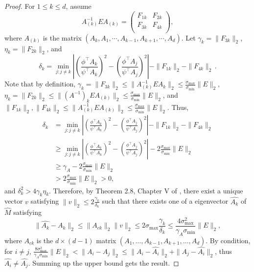 \begin{proof}
For $1\le k\le d$, assume 
\[
A_{(k)}^{-1} E A_{(k)} =  
\left(
\begin{array}{cc}
F_{1k} & F_{2k}\\
F_{3k} & F_{4k} \\
\end{array} 
\right), 
\]
where $A_{(k)}$ is the matrix $(A_k, A_1, \cdots, A_{k-1}, A_{k+1}, \cdots, A_d)$.
Let $\gamma_k = \|F_{3k}\|_2$, $\eta_k = \|F_{2k}\|_2$, and 
\[
\delta_k = \min_{j: j\neq k} 
\left\vert \left(\frac{\phi^{\top}A_k}{\psi^{\top}A_k}\right)^2 -\left( \frac{\phi^{\top}A_j}{\psi^{\top}A_j}\right)^2 \right\vert - \|F_{1k}\|_2 - \|F_{4k}\|_2\,.
\]
Note that by definition, $\gamma_k = \|F_{3k}\|_2\le\|A_{(k)}^{-1}EA_{k}\|_2\le\frac{\sigma_{\max}}{\sigma_{\min}}\|E\|_2$,
 $\eta_k = \|F_{2k}\|_2\le\|(A^{-1})_kEA_{(k)}\|_2\le\frac{\sigma_{\max}}{\sigma_{\min}}\|E\|_2$, 
 and $\|F_{1k}\|_2,\|F_{4k}\|_2\le\|A_{(k)}^{-1} E A_{(k)}\|_2\le\frac{\sigma_{\max}}{\sigma_{\min}}\|E\|_2$. 
 Thus,
\begin{align*}
\delta_k & = \min_{j:j\neq k} 
	\left\vert \left(\frac{\phi^{\top}A_k}{\psi^{\top}A_k}\right)^2 - \left(\frac{\phi^{\top}A_j}{\psi^{\top}A_j}\right)^2 \right\vert - \|F_{1k}\|_2 - \|F_{4k}\|_2\\
	& \ge \min_{j:j\neq k} \left\vert \left(\frac{\phi^{\top}A_k}{\psi^{\top}A_k}\right)^2 - \left(\frac{\phi^{\top}A_j}{\psi^{\top}A_j}\right)^2 \right\vert - 2 \frac{\sigma_{\max}}{\sigma_{\min}}\|E\|_2\\
	& \ge  \gamma_A -  2 \frac{\sigma_{\max}}{\sigma_{\min}}\|E\|_2 \\
	& >  2 \frac{\sigma_{\max}}{\sigma_{\min}}\|E\|_2 >0,
\end{align*}
and $\delta_k^2 > 4\gamma_k\eta_k$. 
Therefore, by Theorem 2.8, Chapter V of \citep{stewart1990matrix}, there exist a unique vector $v$ satisfying $\|v\|_2\le 2\frac{\gamma_k}{\delta_k}$ such that there exists one of a eigenvector $\hat{A_k}$ of $\hat{M}$ satisfying
 \[
 \|\hat{A_k} - A_k\|_2 \le \|A_{ck}\|_2 \|v\|_2 \le 2\sigma_{\max}\frac{\gamma_k}{\delta_k}
 \le 
 \frac{4\sigma_{\max}^2}{\gamma_A \sigma_{\min} } \|E\|_2,
 \]
 where $A_{ck}$ is the $d\times (d-1)$ matrix $(A_1,\ldots,A_{k-1}, A_{k+1},\ldots,A_d)$.
 By condition, for $i\neq j$,  $\frac{8\sigma_{\max}^2}{\gamma_A \sigma_{\min} } \|E\|_2 < \|A_i - A_j\|_2\le \|A_i - \hat{A_i}\|_2 + \|A_j - \hat{A_i}\|_2$, thus $\hat{A_i} \neq \hat{A_j}$.  Summing up the upper bound gets the result. 
\end{proof}
